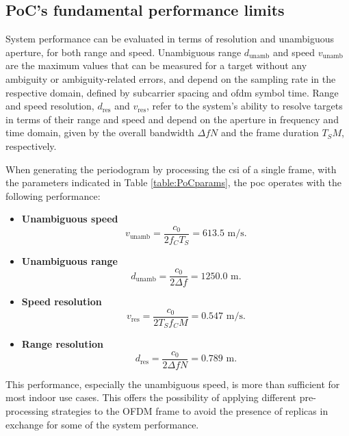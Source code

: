	\subsection{PoC's fundamental performance limits}
		
		System performance can be evaluated in terms of resolution and unambiguous aperture, for both range and speed.
		Unambiguous range $d_{\text{unamb}}$ and speed $v_{\text{unamb}}$ are the maximum values that can be measured for a target without any ambiguity or ambiguity-related errors, and depend on the sampling rate in the respective domain, defined by subcarrier spacing and \gls{ofdm} symbol time.
		Range and speed resolution, $d_{\text{res}}$ and $v_{\text{res}}$, refer to the system's ability to resolve targets in terms of their range and speed and depend on the aperture in frequency and time domain, given by the overall bandwidth $\Delta f N$ and the frame duration $T_S M$, respectively. 
	
		When generating the periodogram by processing the \gls{csi} of a single frame, with the parameters indicated in Table \ref{table:PoCparams},
		the \gls{poc} operates with the following performance:
		
		\begin{itemize}
			\item \textbf{Unambiguous speed}
			\vspace{-\baselineskip} %
			\begin{equation}
				v_{\text{unamb}} = \frac{c_0}{2f_C T_S} = 613.5\text{ m/s}.
			\end{equation}
			
			\item \textbf{Unambiguous range}
			\begin{equation}
				d_{\text{unamb}} = \frac{c_0}{2\Delta f} = 1250.0\text{ m}.
			\end{equation}
			\item \textbf{Speed resolution}
			\begin{equation}
				v_{\text{res}} = \frac{c_0}{2T_Sf_CM} = 0.547 \text{ m/s}.
			\end{equation} 
			\item \textbf{Range resolution}
			\begin{equation}
				d_{\text{res}} = \frac{c_0}{2\Delta fN} = 0.789 \text{ m}.
			\end{equation}  
		\end{itemize}
			This performance, especially the unambiguous speed, is more than sufficient for most indoor use cases. 
			This offers the possibility of applying different pre-processing strategies to the OFDM frame to avoid the presence of replicas in exchange for some of the system performance. 
			
